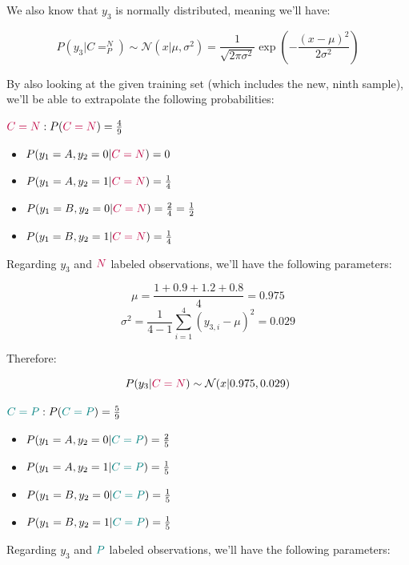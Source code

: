 \documentclass[12pt]{article}
\begin{document}
\begin{enumerate}[leftmargin=\labelsep]
  We also know that $y_3$ is normally distributed, meaning we'll have:

  $$
  P(y_3 | C = ^N_P) \sim \mathcal{N}(x | \mu, \sigma^2) = \frac{1}{\sqrt{2 \pi \sigma^2}} \exp \left( - \frac{(x - \mu)^2}{2 \sigma^2} \right)
  $$

  By also looking at the given training set (which includes the new, ninth sample), we'll be able
  to extrapolate the following probabilities:

  \pagebreak

  \begin{multicols}{2}
    \setlength{\columnseprule}{1pt}
    \def\columnseprulecolor{\color{black}}
    \centering
    $\textcolor{purple}{C = N}: P(\textcolor{purple}{C = N}) = \frac{4}{9}$
    \begin{itemize}
      \item $P(y_1 = A, y_2 = 0 | \textcolor{purple}{C = N}) = 0$
      \item $P(y_1 = A, y_2 = 1 | \textcolor{purple}{C = N}) = \frac{1}{4}$
      \item $P(y_1 = B, y_2 = 0 | \textcolor{purple}{C = N}) = \frac{2}{4} = \frac{1}{2}$
      \item $P(y_1 = B, y_2 = 1 | \textcolor{purple}{C = N}) = \frac{1}{4}$
    \end{itemize}
    Regarding $y_3$ and $\textcolor{purple}{N}$ labeled observations, we'll have the following parameters:
    
    $$
    \mu = \frac{1 + 0.9 + 1.2 + 0.8}{4} = 0.975
    $$
    $$
    \sigma^2 = \frac{1}{4 - 1} \sum_{i = 1}^4 (y_{3, i} - \mu)^2 = 0.029
    $$

    Therefore:

    \vspace{-0.6cm}

    $$
    P(y_3 | \textcolor{purple}{C = N}) \sim \mathcal{N}(x | 0.975, 0.029)
    $$

    \columnbreak
    $\textcolor{teal}{C = P}: P(\textcolor{teal}{C = P}) = \frac{5}{9}$
    \begin{itemize}
      \item $P(y_1 = A, y_2 = 0 | \textcolor{teal}{C = P}) = \frac{2}{5}$
      \item $P(y_1 = A, y_2 = 1 | \textcolor{teal}{C = P}) = \frac{1}{5}$
      \item $P(y_1 = B, y_2 = 0 | \textcolor{teal}{C = P}) = \frac{1}{5}$
      \item $P(y_1 = B, y_2 = 1 | \textcolor{teal}{C = P}) = \frac{1}{5}$
    \end{itemize}
    Regarding $y_3$ and $\textcolor{teal}{P}$ labeled observations, we'll have the following parameters:


\end{multicols}
\end{enumerate}
\end{document}

